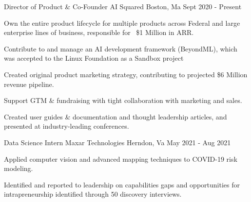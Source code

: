 

\begin{cventries}

  \cventry
    {Director of Product \& Co-Founder} %
    {AI Squared} %
    {Boston, Ma} %
    {Sept 2020 - Present} %
    {
      \begin{cvitems} %
        \item {Own the entire product lifecycle for multiple products across Federal and large enterprise lines of business, responsible for ~\$1 Million in ARR.}
        \item{Contribute to and manage an AI development framework (BeyondML), which was accepted to the Linux Foundation as a Sandbox project}
        \item{Created original product marketing strategy, contributing to projected \$6 Million revenue pipeline.}
        \item{Support GTM \& fundraising with tight collaboration with marketing and sales.}
        \item{Created user guides \& documentation and thought leadership articles, and presented at industry-leading conferences.}
      \end{cvitems}
    }

  \cventry
    {Data Science Intern} %
    {Maxar Technologies} %
    {Herndon, Va} %
    {May 2021 - Aug 2021} %
    {
      \begin{cvitems} %
        \item {Applied computer vision and advanced mapping techniques to COVID-19 risk modeling.}
        \item {Identified and reported to leadership on capabilities gaps and opportunities for intrapreneurship identified through 50 discovery interviews.}
      \end{cvitems}
    }


\end{cventries}
